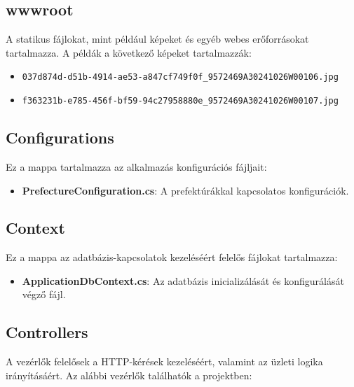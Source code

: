\documentclass{report}[11pt]
\begin{document}
\subsection{wwwroot}
A statikus fájlokat, mint például képeket és egyéb webes erőforrásokat tartalmazza. A példák a következő képeket tartalmazzák:

\begin{itemize}
    \item \texttt{037d874d-d51b-4914-ae53-a847cf749f0f\_9572469A30241026W00106.jpg}
    \item \texttt{f363231b-e785-456f-bf59-94c27958880e\_9572469A30241026W00107.jpg}
\end{itemize}

\subsection{Configurations}
Ez a mappa tartalmazza az alkalmazás konfigurációs fájljait:

\begin{itemize}
    \item \textbf{PrefectureConfiguration.cs}: A prefektúrákkal kapcsolatos konfigurációk.
\end{itemize}

\subsection{Context}
Ez a mappa az adatbázis-kapcsolatok kezeléséért felelős fájlokat tartalmazza:

\begin{itemize}
    \item \textbf{ApplicationDbContext.cs}: Az adatbázis inicializálását és konfigurálását végző fájl.
\end{itemize}

\subsection{Controllers}

A vezérlők felelősek a HTTP-kérések kezeléséért, valamint az üzleti logika irányításáért. Az alábbi vezérlők találhatók a projektben:
\end{document}
